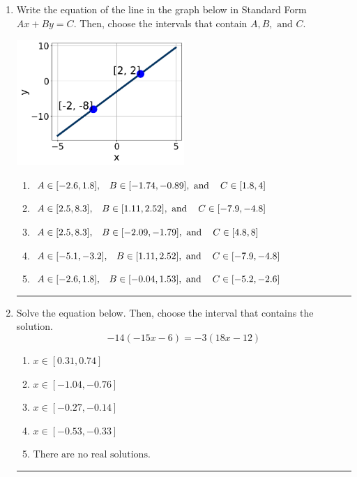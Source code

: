 \documentclass[14pt]{extbook}
\newcommand{\litem}[1]{\item#1\hspace*{-1cm}\rule{\textwidth}{0.4pt}}
\begin{document}
\begin{enumerate}
{\begin{enumerate}[label=\Alph*.]
\end{enumerate} }
\litem{
Write the equation of the line in the graph below in Standard Form $Ax+By=C$. Then, choose the intervals that contain $A, B, \text{ and } C$.
\begin{center}
    \includegraphics[width=0.5\textwidth]{../Figures/linearGraphToStandardB.png}
\end{center}
\begin{enumerate}[label=\Alph*.]
\item \( A \in [-2.6, 1.8], \hspace{3mm} B \in [-1.74, -0.89], \text{ and } \hspace{3mm} C \in [1.8, 4] \)
\item \( A \in [2.5, 8.3], \hspace{3mm} B \in [1.11, 2.52], \text{ and } \hspace{3mm} C \in [-7.9, -4.8] \)
\item \( A \in [2.5, 8.3], \hspace{3mm} B \in [-2.09, -1.79], \text{ and } \hspace{3mm} C \in [4.8, 8] \)
\item \( A \in [-5.1, -3.2], \hspace{3mm} B \in [1.11, 2.52], \text{ and } \hspace{3mm} C \in [-7.9, -4.8] \)
\item \( A \in [-2.6, 1.8], \hspace{3mm} B \in [-0.04, 1.53], \text{ and } \hspace{3mm} C \in [-5.2, -2.6] \)

\end{enumerate} }
\litem{
Solve the equation below. Then, choose the interval that contains the solution.\[ -14(-15x -6) = -3(18x -12) \]\begin{enumerate}[label=\Alph*.]
\item \( x \in [0.31, 0.74] \)
\item \( x \in [-1.04, -0.76] \)
\item \( x \in [-0.27, -0.14] \)
\item \( x \in [-0.53, -0.33] \)
\item \( \text{There are no real solutions.} \)


\end{enumerate}}
\end{enumerate}
\end{document}
